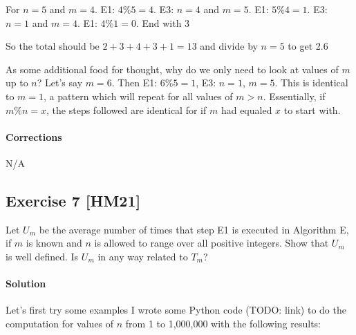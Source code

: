 \documentclass{report}
\begin{document}
			For $n=5$ and $m=4$. E1: $4\%5 = 4$. E3: $n=4$ and $m=5$. E1: $5\%4=1$. E3: $n=1$ and $m=4$. E1: $4\%1=0$. End with 3
			
			So the total should be $2+3+4+3+1=13$ and divide by $n=5$ to get 2.6
			
			As some additional food for thought, why do we only need to look at values of $m$ up to $n$? Let's say $m=6$. Then E1: $6\%5=1$, E3: $n=1$, $m=5$. This is identical to $m=1$, a pattern which will repeat for all values of $m > n$. Essentially, if $m\%n=x$, the steps followed are identical for if $m$ had equaled $x$ to start with.
			
			\paragraph{Corrections} N/A
			
		
		\subsection*{Exercise 7 [HM21]} 
		
			Let $U_m$ be the average number of times that step E1 is executed in Algorithm E, if $m$ is known and $n$ is allowed to range over all positive integers. Show that $U_m$ is well defined. Is $U_m$ in any way related to $T_m$?
			
			\paragraph{Solution} Let's first try some examples I wrote some Python code (TODO: link) to do the computation for values of $n$ from 1 to 1,000,000 with the following results:
			
\end{document}
